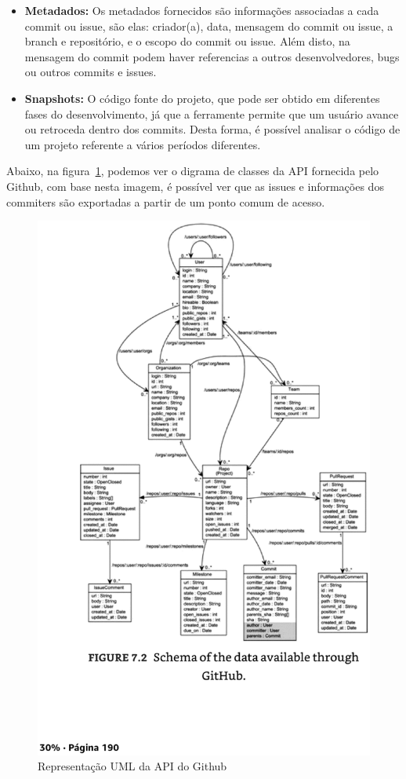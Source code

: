 \begin{itemize}
\item \textbf{Metadados:} Os metadados fornecidos são informações associadas a cada
commit ou issue, são elas: criador(a), data, mensagem do commit ou issue, a branch e repositório,
e o escopo do commit ou issue. Além disto, na mensagem do commit podem haver referencias a outros
desenvolvedores, bugs ou outros commits e issues.
\item \textbf{Snapshots:} O código fonte do projeto, que pode ser obtido em diferentes
fases do desenvolvimento, já que a ferramente permite que um usuário avance ou retroceda
dentro dos commits. Desta forma, é possível analisar o código de um projeto referente
a vários períodos diferentes.
\end{itemize}

Abaixo, na figura~\ref{fig:github_api}, podemos ver o digrama de classes da API fornecida pelo
Github, com base nesta imagem, é possível ver que as issues e informações dos commiters
são exportadas a partir de um ponto comum de acesso.

\begin{figure}[h]
    \centering
    \label{fig:github_api}
        \includegraphics[keepaspectratio=true,scale=0.3]{figuras/github_api_diagram.eps}
    \caption{Representação UML da API do Github}
\end{figure}

